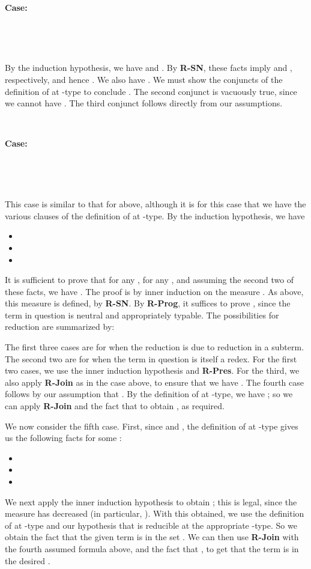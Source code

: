 \documentclass[copyright]{eptcs}
\begin{document}
\ 

\noindent \textbf{Case:}

\



\ 

\noindent By the induction hypothesis, we have  and .  By \textbf{R-SN}, these facts imply
 and , respectively, and hence
.  We also have .
We must show the conjuncts of the definition of  at
-type to conclude .  The second
conjunct is vacuously true, since we cannot have
. The third conjunct follows directly
from our assumptions.

\ 

\noindent \textbf{Case:}

\



\ 

\noindent This case is similar to that for  above, although it
is for this case that we have the various clauses of the definition of
 at -type.  By the induction hypothesis, we have
\begin{itemize}
\item 
\item 
\item 
\end{itemize}

\noindent It is sufficient to prove that for any , for any
, and assuming the
second two of these facts, we have . The proof is by inner
induction on the measure .
As above, this measure is defined, by \textbf{R-SN}.  By
\textbf{R-Prog}, it suffices to prove , since
the term in question is neutral and appropriately typable.  The
possibilities for reduction are summarized by:


\noindent The first three cases are for when the reduction is due to
reduction in a subterm.  The second two are for when the term in
question is itself a redex.  For the first two cases, we use the inner
induction hypothesis and \textbf{R-Pres}.  For the third, we also
apply \textbf{R-Join} as in the  case above, to ensure that we
have .  The fourth
case follows by our assumption that .  By the definition of
 at -type, we have ; so we can
apply \textbf{R-Join} and the fact that  to obtain
, as required.

We now consider the fifth case. First, since 
and , the
definition of  at -type gives us the following
facts for some :
\begin{itemize}
\item 
\item 
\item 
\end{itemize}
\noindent We next apply the inner induction hypothesis to obtain
; this is legal,
since the measure has decreased (in particular, ).  With
this obtained, we use the definition of  at -type
and our hypothesis that  is reducible at the appropriate
-type.  So we obtain the fact that the given term is in the set
.  We can then
use \textbf{R-Join} with the fourth assumed formula above, and the
fact that , to get that the term is in the
desired .
\end{document}
